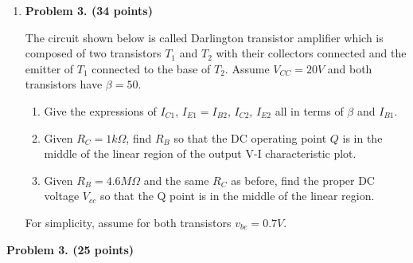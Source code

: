 \begin{enumerate}
\item {\bf Problem 3. (34 points)} 



The circuit shown below is called Darlington transistor amplifier which is
composed of two transistors $T_1$ and $T_2$ with their collectors connected 
and the emitter of $T_1$ connected to the base of $T_2$. Assume $V_{CC}=20V$ 
and both transistors have $\beta=50$. 
\begin{enumerate}
\item Give the expressions of $I_{C1}$, $I_{E1}=I_{B2}$, $I_{C2}$, $I_{E2}$
  all in terms of $\beta$ and $I_{B1}$.
\item Given $R_C=1 k\Omega$, find $R_B$ so that the DC operating point $Q$
  is in the middle of the linear region of the output V-I characteristic plot.
\item Given $R_B= 4.6 M\Omega$ and the same $R_C$ as before, find the proper 
DC voltage $V_{cc}$ so that the Q point is in the middle of the linear region.
\end{enumerate}
For simplicity, assume for both transistors $v_{be}=0.7V$.





\end{enumerate}



\item {\bf Problem 3. (25 points)} 



